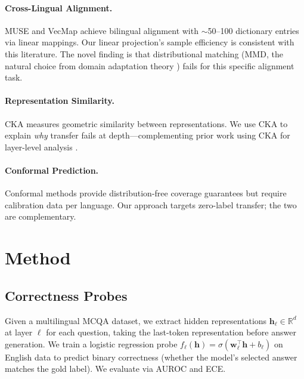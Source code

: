\documentclass[11pt,a4paper]{article}
\begin{document}
\paragraph{Cross-Lingual Alignment.}
MUSE \cite{conneau2018muse} and VecMap \cite{artetxe2018vecmap} achieve bilingual alignment with $\sim$50--100 dictionary entries via linear mappings. Our linear projection's sample efficiency is consistent with this literature. The novel finding is that distributional matching (MMD, the natural choice from domain adaptation theory \cite{bendavid2010theory}) fails for this specific alignment task.

\paragraph{Representation Similarity.}
CKA \cite{kornblith2019similarity} measures geometric similarity between representations. We use CKA to explain \emph{why} transfer fails at depth---complementing prior work using CKA for layer-level analysis \cite{nguyen2021wide}.

\paragraph{Conformal Prediction.}
Conformal methods \cite{angelopoulos2023conformal} provide distribution-free coverage guarantees but require calibration data per language. Our approach targets zero-label transfer; the two are complementary.

\section{Method}
\label{sec:method}

\subsection{Correctness Probes}
\label{sec:probes}

Given a multilingual MCQA dataset, we extract hidden representations $\mathbf{h}_\ell \in \mathbb{R}^d$ at layer $\ell$ for each question, taking the last-token representation before answer generation. We train a logistic regression probe $f_\ell(\mathbf{h}) = \sigma(\mathbf{w}_\ell^\top \mathbf{h} + b_\ell)$ on English data to predict binary correctness (whether the model's selected answer matches the gold label). We evaluate via AUROC and ECE.
\end{document}
